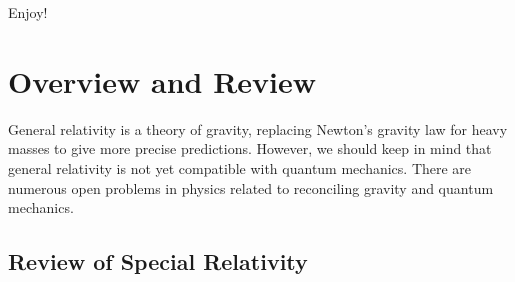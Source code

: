 \documentclass{article}
\theoremstyle{definition}
\begin{document}
Enjoy!

\newpage
\tableofcontents
\newpage

\section{Overview and Review}

General relativity is a theory of gravity, replacing Newton's gravity law for heavy masses to give more precise predictions. However, we should keep in mind that general relativity is not yet compatible with quantum mechanics. There are numerous open problems in physics related to reconciling gravity and quantum mechanics. 

\subsection{Review of Special Relativity}
\end{document}
